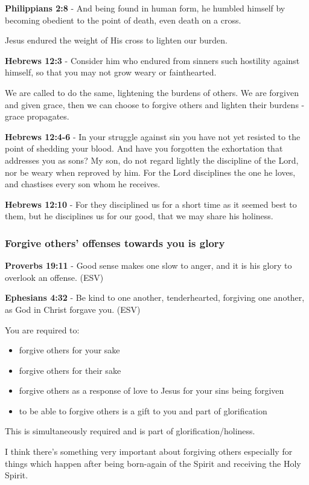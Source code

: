 \documentclass[11pt]{article}
\begin{document}
\textbf{Philippians 2:8} - And being found in human form, he humbled himself by becoming obedient to the point of death, even death on a cross.

Jesus endured the weight of His cross to lighten our burden.

\textbf{Hebrews 12:3} - Consider him who endured from sinners such hostility against himself, so that you may not grow weary or fainthearted.

We are called to do the same, lightening the burdens of others.
We are forgiven and given grace, then we can choose to forgive others and lighten their burdens - grace propagates.

\textbf{Hebrews 12:4-6} - In your struggle against sin you have not yet resisted to the point of shedding your blood. And have you forgotten the exhortation that addresses you as sons? My son, do not regard lightly the discipline of the Lord, nor be weary when reproved by him. For the Lord disciplines the one he loves, and chastises every son whom he receives.

\textbf{Hebrews 12:10} - For they disciplined us for a short time as it seemed best to them, but he disciplines us for our good, that we may share his holiness.

\subsubsection{Forgive others' offenses towards you is glory}
\label{sec:org328366f}
\textbf{Proverbs 19:11} - Good sense makes one slow to anger, and it is his glory to overlook an offense. (ESV)

\textbf{Ephesians 4:32} - Be kind to one another, tenderhearted, forgiving one another, as God in Christ forgave you. (ESV)

You are required to:
\begin{itemize}
\item forgive others for your sake
\item forgive others for their sake
\item forgive others as a response of love to Jesus for your sins being forgiven
\item to be able to forgive others is a gift to you and part of glorification
\end{itemize}

This is simultaneously required and is part of glorification/holiness.

I think there's something very important about forgiving others especially for things which happen after being born-again of the Spirit and receiving the Holy Spirit.
\end{document}
